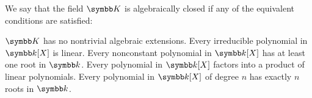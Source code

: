 \begin{definition}\label{def:algebraically_closed_field}\cite[proposition 9.20]{Knapp2016BAlg}
  We say that the field \( \BK \) is algebraically closed if any of the equivalent conditions are satisfied:
  \begin{defenum}
     \( \BK \) has no nontrivial algebraic extensions.
     Every irreducible polynomial in \( \Bk[X] \) is linear.
     Every nonconstant polynomial in \( \Bk[X] \) has at least one root in \( \Bk \).
     Every polynomial in \( \Bk[X] \) factors into a product of linear polynomials.
     Every polynomial in \( \Bk[X] \) of degree \( n \) has exactly \( n \) roots in \( \Bk \).
  \end{defenum}
\end{definition}
